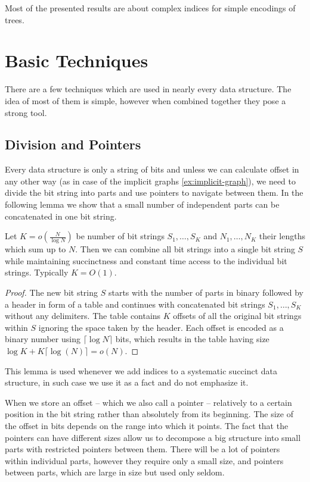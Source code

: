 \bigbreak

Most of the presented results are about complex indices for simple encodings of trees.

\section{Basic Techniques}

There are a few techniques which are used in nearly every data structure.
The idea of most of them is simple, however when combined together they pose a strong tool.

\subsection{Division and Pointers}

Every data structure is only a string of bits and unless we can calculate offset in any other way (as in case of the implicit graphs \ref{ex:implicit-graph}), we need to divide the bit string into parts and use pointers to navigate between them.
In the following lemma we show that a small number of independent parts can be concatenated in one bit string.

\begin{lemma}\label{l:concat}
	Let $K = o(\frac{N}{\log N})$ be number of bit strings $S_1, \ldots, S_K$ and $N_1, \dots, N_K$ their lengths which sum up to $N$.
	Then we can combine all bit strings into a single bit string $S$ while maintaining succinctness and constant time access to the individual bit strings.
	Typically $K = O(1)$.
\end{lemma}
\begin{proof}
	The new bit string $S$ starts with the number of parts in binary followed by a header in form of a table and continues with concatenated bit strings $S_1, \ldots, S_K$ without any delimiters.
	The table contains $K$ offsets of all the original bit strings within $S$ ignoring the space taken by the header.
	Each offset is encoded as a binary number using $\lceil \log N \rceil$ bits, which results in the table having size $\log K + K \lceil \log (N) \rceil = o(N)$.
\end{proof}

This lemma is used whenever we add indices to a systematic succinct data structure, in such case we use it as a fact and do not emphasize it.

When we store an offset -- which we also call a pointer -- relatively to a certain position in the bit string rather than absolutely from its beginning.
The size of the offset in bits depends on the range into which it points.
The fact that the pointers can have different sizes allow us to decompose a big structure into small parts with restricted pointers between them.
There will be a lot of pointers within individual parts, however they require only a small size, and pointers between parts, which are large in size but used only seldom.

